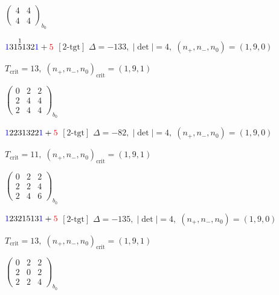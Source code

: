 \documentclass[10pt]{article}
\begin{document}
\hspace{2em}$\left(\begin{smallmatrix}4 & 4 \\ 4 & 4\end{smallmatrix}\right)_{\!b_0}$

\smallskip

$\textcolor{blue}{1}31\overset{1}{5}132\textcolor{blue}{1}+\textcolor{red}{5}$ $\scriptstyle [2\text{-tgt}]$ \quad $\Delta=-133,\; |\det|=4,\; (n_+,n_-,n_0)=(1,9,0)$

\hspace{1em}$T_{\text{crit}}=13,\; (n_+,n_-,n_0)_{\text{crit}}=(1,9,1)$

\hspace{2em}$\left(\begin{smallmatrix}0 & 2 & 2 \\ 2 & 4 & 4 \\ 2 & 4 & 4\end{smallmatrix}\right)_{\!b_0}$

\smallskip

$\textcolor{blue}{1}2231322\textcolor{blue}{1}+\textcolor{red}{5}$ $\scriptstyle [2\text{-tgt}]$ \quad $\Delta=-82,\; |\det|=4,\; (n_+,n_-,n_0)=(1,9,0)$

\hspace{1em}$T_{\text{crit}}=11,\; (n_+,n_-,n_0)_{\text{crit}}=(1,9,1)$

\hspace{2em}$\left(\begin{smallmatrix}0 & 2 & 2 \\ 2 & 2 & 4 \\ 2 & 4 & 6\end{smallmatrix}\right)_{\!b_0}$

\smallskip

$\textcolor{blue}{1}2321513\textcolor{blue}{1}+\textcolor{red}{5}$ $\scriptstyle [2\text{-tgt}]$ \quad $\Delta=-135,\; |\det|=4,\; (n_+,n_-,n_0)=(1,9,0)$

\hspace{1em}$T_{\text{crit}}=13,\; (n_+,n_-,n_0)_{\text{crit}}=(1,9,1)$

\hspace{2em}$\left(\begin{smallmatrix}0 & 2 & 2 \\ 2 & 0 & 2 \\ 2 & 2 & 4\end{smallmatrix}\right)_{\!b_0}$
\end{document}
